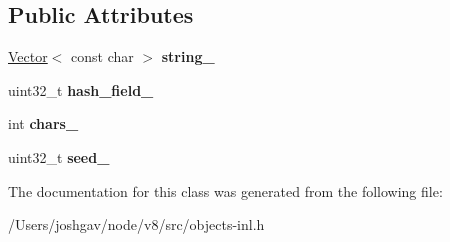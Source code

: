 \subsection*{Public Attributes}
\begin{DoxyCompactItemize}
\item 
\hyperlink{classv8_1_1internal_1_1_vector}{Vector}$<$ const char $>$ {\bfseries string\+\_\+}\hypertarget{classv8_1_1internal_1_1_utf8_string_key_ac0c854f6c0d7a5b5d367bb1f85d5a039}{}\label{classv8_1_1internal_1_1_utf8_string_key_ac0c854f6c0d7a5b5d367bb1f85d5a039}

\item 
uint32\+\_\+t {\bfseries hash\+\_\+field\+\_\+}\hypertarget{classv8_1_1internal_1_1_utf8_string_key_aa574d16e9bdae63235d2586369dcd174}{}\label{classv8_1_1internal_1_1_utf8_string_key_aa574d16e9bdae63235d2586369dcd174}

\item 
int {\bfseries chars\+\_\+}\hypertarget{classv8_1_1internal_1_1_utf8_string_key_a14a27629e8ed4eeed5fc67fdfcbdd4ce}{}\label{classv8_1_1internal_1_1_utf8_string_key_a14a27629e8ed4eeed5fc67fdfcbdd4ce}

\item 
uint32\+\_\+t {\bfseries seed\+\_\+}\hypertarget{classv8_1_1internal_1_1_utf8_string_key_a5f7a2097fd04d9ec7afe065d74005275}{}\label{classv8_1_1internal_1_1_utf8_string_key_a5f7a2097fd04d9ec7afe065d74005275}

\end{DoxyCompactItemize}


The documentation for this class was generated from the following file\+:\begin{DoxyCompactItemize}
\item 
/\+Users/joshgav/node/v8/src/objects-\/inl.\+h\end{DoxyCompactItemize}
